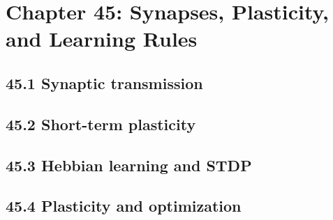 \section{Chapter 45: Synapses, Plasticity, and Learning Rules}

\subsection{45.1 Synaptic transmission}

\subsection{45.2 Short-term plasticity}

\subsection{45.3 Hebbian learning and STDP}

\subsection{45.4 Plasticity and optimization}

\clearpage
